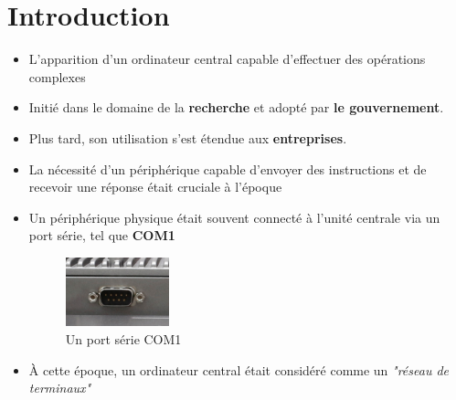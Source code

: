 \section{Introduction}

\begin{frame}

	\begin{itemize}[<+->]
		\item L'apparition d'un ordinateur central capable d'effectuer des opérations complexes
		\item Initié dans le domaine de la \textbf{recherche} et adopté par \textbf{le gouvernement}.
		\item Plus tard, son utilisation s'est étendue aux \textbf{entreprises}.
	\end{itemize}

\end{frame}

\begin{frame}

	\begin{itemize}[<+->]
			\item La nécessité d'un périphérique capable d'envoyer des instructions et de recevoir une réponse était cruciale à l'époque

			\item Un périphérique physique était souvent connecté à l'unité centrale via un port série, tel que \textbf{COM1}

				\begin{figure}
					\centering
					\includegraphics[width=3cm]{images/com1_serial.jpg}
					\caption{Un port série COM1}
				\end{figure}

			\item À cette époque, un ordinateur central était considéré comme un \textit{"réseau de terminaux"}
	\end{itemize}


\end{frame}

